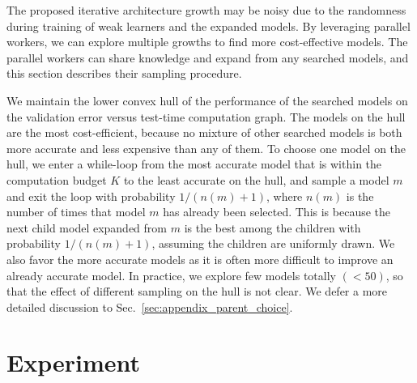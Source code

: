 The proposed iterative architecture growth may be noisy 
due to the randomness during training of weak learners and 
the expanded models. By leveraging parallel workers, we 
can explore multiple growths to find more cost-effective models. 
The parallel workers can share knowledge and expand from any searched models, 
and this section describes their sampling procedure.

We maintain the lower convex hull of the performance of the 
searched models on the validation error versus test-time computation 
graph. The models on the hull are the most cost-efficient, 
because no mixture of other searched models is both more accurate and less expensive
than any of them. To choose one model on the hull, we enter a while-loop
from the most accurate model that is within the computation 
budget $K$ to the least accurate on the hull, 
and sample a model $m$ and exit the loop with probability $1/(n(m) + 1)$, 
where $n(m)$ is the number of times that model $m$ has already been selected. 
This is because the next child model expanded from $m$ is the best among the children with probability
$1/(n(m) + 1)$, assuming the children are uniformly drawn. 
We also favor the more accurate models as it is often more difficult to 
improve an already accurate model. In practice, we explore few 
models totally $(<50)$, so that the effect of different sampling on the hull 
is not clear. We defer a more detailed discussion to Sec.~\ref{sec:appendix_parent_choice}.



    
\section{Experiment}





